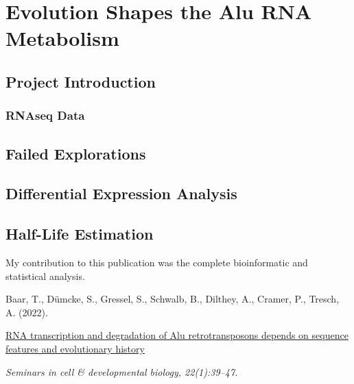 
\chapter{Evolution Shapes the Alu RNA Metabolism}

\section{Project Introduction}

\subsection{RNAseq Data}

\section{Failed Explorations}

\section{Differential Expression Analysis}

\section{Half-Life Estimation}

\vfill
\noindent My contribution to this publication was the complete bioinformatic
and statistical analysis.\nopagebreak
\medskip
\begin{tcolorbox}[
  boxrule=0pt, leftrule=1pt, colframe=s-blue, colback=white, sharp corners=all]%
  \raggedright
  Baar, T., Dümcke, S., Gressel, S., Schwalb, B.,
  Dilthey, A., Cramer, P., Tresch, A. (2022).
  
  \smallskip
  \href{http://www.overleaf.com}
    {RNA transcription and degradation of Alu retrotransposons depends on
    sequence features and evolutionary history}

  \smallskip
  \textit{Seminars in cell \& developmental biology, 22(1):39–47.}
\end{tcolorbox}